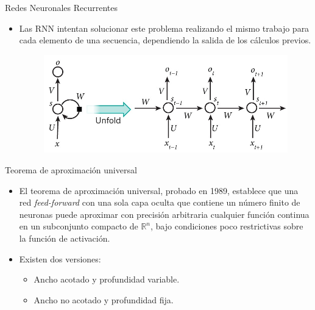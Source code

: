 \documentclass[spanish]{beamer}
\begin{document}
\begin{frame}{Redes Neuronales Recurrentes}
\begin{itemize}
\item Las RNN intentan solucionar este problema realizando el mismo
trabajo para cada elemento de una secuencia, dependiendo la salida
de los cálculos previos.
\begin{figure}[h]
  \centering
  \includegraphics[width=.6\textwidth]{img/rnn}
\end{figure}
\end{itemize}
\end{frame}

\begin{frame}{Teorema de aproximación universal}
  \begin{itemize}
\item El teorema de aproximación universal, probado en 1989, establece que una red \textit{feed-forward} con una sola capa oculta que contiene un número finito de neuronas puede aproximar con precisión arbitraria cualquier función continua en un subconjunto compacto de $\mathbb{R}^n$, bajo condiciones poco restrictivas sobre la función de activación.
\item Existen dos versiones:
\begin{itemize}
  \item Ancho acotado y profundidad variable.
  \item Ancho no acotado y profundidad fija.
\end{itemize}
  \end{itemize}

\end{frame}
\end{document}
